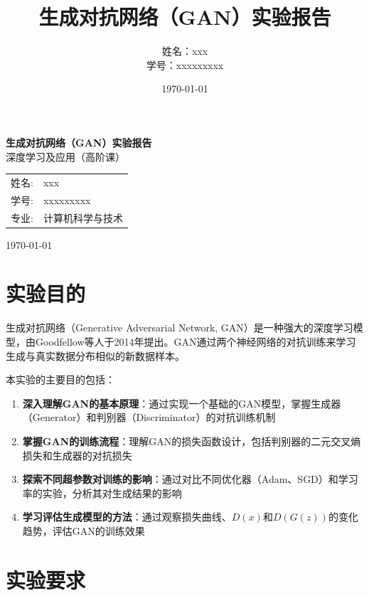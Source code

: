 \documentclass[a4paper]{article}
\title{生成对抗网络（GAN）实验报告}
\author{姓名：xxx \\ 学号：xxxxxxxxx}
\date{\today}
\begin{document}
\begin{titlepage}
    \begin{center}
    \vspace{3cm}
    {\Huge\bfseries 生成对抗网络（GAN）实验报告}\\[2cm]
    {\Large 深度学习及应用（高阶课）}\\[3cm]

    \vspace{2cm}
    {\Large
    \begin{tabular}{rl}
        姓名: & xxx \\
        学号: & xxxxxxxxx \\
        专业: & 计算机科学与技术 \\
    \end{tabular}
    }

    \vfill
    {\Large \today}
    \end{center}
\end{titlepage}

\tableofcontents
\newpage

\section{实验目的}

生成对抗网络（Generative Adversarial Network, GAN）是一种强大的深度学习模型，由Goodfellow等人于2014年提出。GAN通过两个神经网络的对抗训练来学习生成与真实数据分布相似的新数据样本。

本实验的主要目的包括：

\begin{enumerate}
    \item \textbf{深入理解GAN的基本原理}：通过实现一个基础的GAN模型，掌握生成器（Generator）和判别器（Discriminator）的对抗训练机制
    \item \textbf{掌握GAN的训练流程}：理解GAN的损失函数设计，包括判别器的二元交叉熵损失和生成器的对抗损失
    \item \textbf{探索不同超参数对训练的影响}：通过对比不同优化器（Adam、SGD）和学习率的实验，分析其对生成结果的影响
    \item \textbf{学习评估生成模型的方法}：通过观察损失曲线、$D(x)$和$D(G(z))$的变化趋势，评估GAN的训练效果
\end{enumerate}

\section{实验要求}
\end{document}
